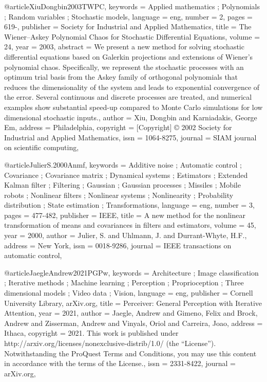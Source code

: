 @article{XiuDongbin2003TWPC,
keywords = {Applied mathematics ; Polynomials ; Random variables ; Stochastic models},
language = {eng},
number = {2},
pages = {619-},
publisher = {Society for Industrial and Applied Mathematics},
title = {The Wiener--Askey Polynomial Chaos for Stochastic Differential Equations},
volume = {24},
year = {2003},
abstract = {We present a new method for solving stochastic differential equations based on Galerkin projections and extensions of Wiener's polynomial chaos. Specifically, we represent the stochastic processes with an optimum trial basis from the Askey family of orthogonal polynomials that reduces the dimensionality of the system and leads to exponential convergence of the error. Several continuous and discrete processes are treated, and numerical examples show substantial speed-up compared to Monte Carlo simulations for low dimensional stochastic inputs.},
author = {Xiu, Dongbin and Karniadakis, George Em},
address = {Philadelphia},
copyright = {[Copyright] © 2002 Society for Industrial and Applied Mathematics},
issn = {1064-8275},
journal = {SIAM journal on scientific computing},
}

@article{JulierS.2000Anmf,
keywords = {Additive noise ; Automatic control ; Covariance ; Covariance matrix ; Dynamical systems ; Estimators ; Extended Kalman filter ; Filtering ; Gaussian ; Gaussian processes ; Missiles ; Mobile robots ; Nonlinear filters ; Nonlinear systems ; Nonlinearity ; Probability distribution ; State estimation ; Transformations},
language = {eng},
number = {3},
pages = {477-482},
publisher = {IEEE},
title = {A new method for the nonlinear transformation of means and covariances in filters and estimators},
volume = {45},
year = {2000},
author = {Julier, S. and Uhlmann, J. and Durrant-Whyte, H.F.},
address = {New York},
issn = {0018-9286},
journal = {IEEE transactions on automatic control},
}

@article{JaegleAndrew2021PGPw,
keywords = {Architecture ; Image classification ; Iterative methods ; Machine learning ; Perception ; Proprioception ; Three dimensional models ; Video data ; Vision},
language = {eng},
publisher = {Cornell University Library, arXiv.org},
title = {Perceiver: General Perception with Iterative Attention},
year = {2021},
author = {Jaegle, Andrew and Gimeno, Felix and Brock, Andrew and Zisserman, Andrew and Vinyals, Oriol and Carreira, Joao},
address = {Ithaca},
copyright = {2021. This work is published under http://arxiv.org/licenses/nonexclusive-distrib/1.0/ (the “License”). Notwithstanding the ProQuest Terms and Conditions, you may use this content in accordance with the terms of the License.},
issn = {2331-8422},
journal = {arXiv.org},
}

